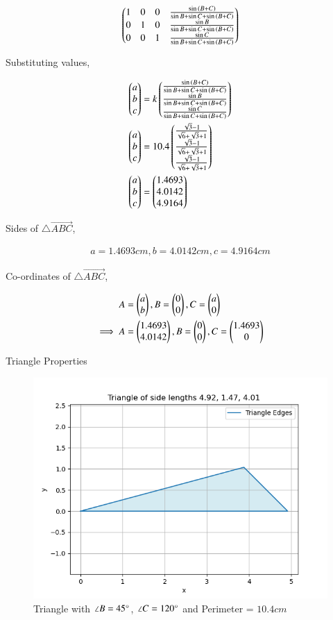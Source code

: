 \documentclass[journal]{IEEEtran}
\begin{document}
\begin{align}
    \begin{pmatrix}1&0&0&\frac{\sin{\ensuremath{\left(B+C\right)}}}{\sin{B}+\sin{C}+\sin{\ensuremath{\left(B+C\right)}}}\\0&1&0&\frac{\sin{B}}{\sin{B}+\sin{C}+\sin{\ensuremath{\left(B+C\right)}}}\\0&0&1&\frac{\sin{C}}{\sin{B}+\sin{C}+\sin{\ensuremath{\left(B+C\right)}}}\end{pmatrix}
\end{align}

Substituting values,

\begin{align}
    \begin{pmatrix}a\\b\\c\end{pmatrix}&=k\begin{pmatrix}\frac{\sin{\ensuremath{\left(B+C\right)}}}{\sin{B}+\sin{C}+\sin{\ensuremath{\left(B+C\right)}}}\\\frac{\sin{B}}{\sin{B}+\sin{C}+\sin{\ensuremath{\left(B+C\right)}}}\\\frac{\sin{C}}{\sin{B}+\sin{C}+\sin{\ensuremath{\left(B+C\right)}}}\end{pmatrix} \\
    \begin{pmatrix}a\\b\\c\end{pmatrix}&=10.4\begin{pmatrix}\frac{\sqrt{3}-1}{\sqrt{6}+\sqrt{3}+1}\\\frac{\sqrt{3}-1}{\sqrt{6}+\sqrt{3}+1}\\\frac{\sqrt{3}-1}{\sqrt{6}+\sqrt{3}+1}\end{pmatrix} \\
    \begin{pmatrix}a\\b\\c\end{pmatrix}&=\begin{pmatrix}1.4693\\4.0142\\4.9164\end{pmatrix}
\end{align}

Sides of $\triangle\vec{ABC}$,

\begin{align}
    a=1.4693cm, b=4.0142cm, c=4.9164cm
\end{align}

Co-ordinates of $\triangle\vec{ABC}$,

\begin{align}
    A&=\begin{pmatrix}a\\b\end{pmatrix}, B=\begin{pmatrix}0\\0\end{pmatrix}, C=\begin{pmatrix}a\\0\end{pmatrix} \\
    \implies A&=\begin{pmatrix}1.4693\\4.0142\end{pmatrix}, B=\begin{pmatrix}0\\0\end{pmatrix}, C=\begin{pmatrix}1.4693\\0\end{pmatrix} 
\end{align}

\begin{table}[h!]    
  \centering
  
  \caption{Triangle Properties}
  \label{tab3.2.19.2}
\end{table}

\begin{figure}[h!]
	\centering
   	\includegraphics[width=0.7\linewidth]{figs/fig.png}
   	\caption{Triangle with $\angle B=45\degree$, $\angle C=120\degree$ and Perimeter = $10.4cm$}
    \label{Plot}
\end{figure}
\end{document}
